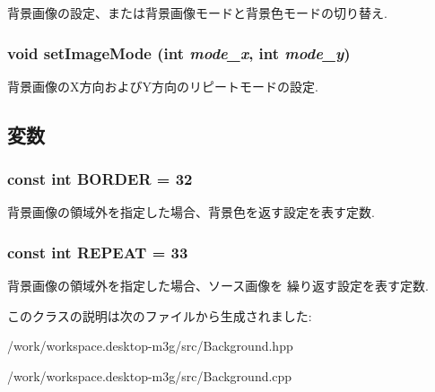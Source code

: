 背景画像の設定、または背景画像モードと背景色モードの切り替え. \hypertarget{classm3g_1_1Background_aba37cb460a2376f1a4722eebb4de9a9}{
\subsubsection[{setImageMode}]{\setlength{\rightskip}{0pt plus 5cm}void setImageMode (int {\em mode\_\-x}, \/  int {\em mode\_\-y})}}
\label{classm3g_1_1Background_aba37cb460a2376f1a4722eebb4de9a9}


背景画像のX方向およびY方向のリピートモードの設定. 

\subsection{変数}
\hypertarget{classm3g_1_1Background_ee380e01b33e589c24984e4c4c1c6501}{
\subsubsection[{BORDER}]{\setlength{\rightskip}{0pt plus 5cm}const int {\bf BORDER} = 32}}
\label{classm3g_1_1Background_ee380e01b33e589c24984e4c4c1c6501}


背景画像の領域外を指定した場合、背景色を返す設定を表す定数. \hypertarget{classm3g_1_1Background_a466d02b3d88f856854d0a0955be32e8}{
\subsubsection[{REPEAT}]{\setlength{\rightskip}{0pt plus 5cm}const int {\bf REPEAT} = 33}}
\label{classm3g_1_1Background_a466d02b3d88f856854d0a0955be32e8}


背景画像の領域外を指定した場合、ソース画像を 繰り返す設定を表す定数. 

このクラスの説明は次のファイルから生成されました:\begin{CompactItemize}
\item 
/work/workspace.desktop-m3g/src/Background.hpp\item 
/work/workspace.desktop-m3g/src/Background.cpp\end{CompactItemize}
